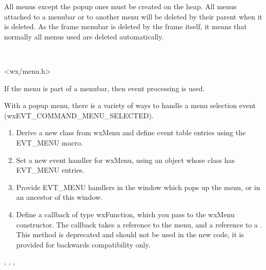 
All menus except the popup ones must be created on the heap. All menus
attached to a menubar or to another menu will be deleted by their parent when
it is deleted. As the frame menubar is deleted by the frame itself, it means
that normally all menus used are deleted automatically.


\\


<wx/menu.h>


If the menu is part of a menubar, then  event processing is used.

With a popup menu, there is a variety of ways to handle a menu selection event
(wxEVT\_COMMAND\_MENU\_SELECTED).

\begin{enumerate}\itemsep=0pt
\item Derive a new class from wxMenu and define event table entries using the EVT\_MENU macro.
\item Set a new event handler for wxMenu, using an object whose class has EVT\_MENU entries.
\item Provide EVT\_MENU handlers in the window which pops up the menu, or in an ancestor of
this window.
\item Define a callback of type wxFunction, which you pass to the wxMenu constructor.
The callback takes a reference to the menu, and a reference to a
. This method is deprecated and should
not be used in the new code, it is provided for backwards compatibility only.
\end{enumerate}


, ,\rtfsp
{},\rtfsp
{}




\label{wxmenuctor}



